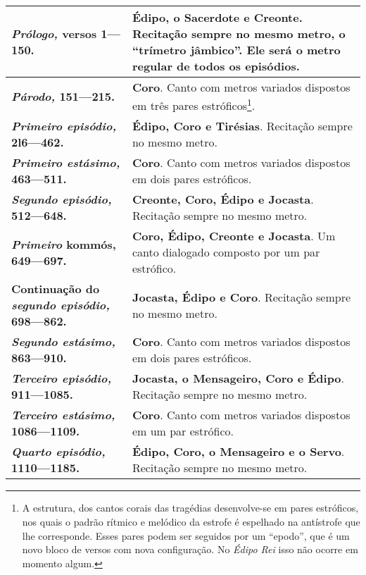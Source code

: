 \begin{tabular}[c]{|p{}|p{}|}
    \hline
    \textbf{\emph{Prólogo,} versos 1---150.}                    & \textbf{Édipo, o Sacerdote e Creonte}. Recitação sempre no mesmo metro, o ``trímetro jâmbico''. Ele será o metro regular de todos os episódios. \\ \hline
    \textbf{\emph{Párodo,} 151---215.}                          & \textbf{Coro}. Canto com metros variados dispostos em três pares estróficos\footnote{ A estrutura, dos cantos corais das tragédias desenvolve-se em pares estróficos, nos quais o padrão rítmico e melódico da estrofe é espelhado na antístrofe que lhe corresponde. Esses pares podem ser seguidos por um ``epodo'', que é um novo bloco de versos com nova configuração. No \emph{Édipo Rei} isso não ocorre em momento algum.}. \\ \hline
    \textbf{\emph{Primeiro episódio,} 2l6---462.}               & \textbf{Édipo, Coro e Tirésias}. Recitação sempre no mesmo metro. \\ \hline
    \textbf{\emph{Primeiro estásimo,} 463---511.}            & \textbf{Coro}. Canto com metros variados dispostos em dois pares estróficos. \\ \hline
    \textbf{\emph{Segundo episódio,} 512---648.}                & \textbf{Creonte, Coro, Édipo e Jocasta}. Recitação sempre no mesmo metro.  \\ \hline
    \textbf{\emph{Primeiro} kommós, 649---697.}       			& \textbf{Coro, Édipo, Creonte e Jocasta}. Um canto dialogado composto por um par estrófico. \\ \hline
    \textbf{Continuação do \emph{segundo episódio,} 698---862.} & \textbf{Jocasta, Édipo e Coro}. Recitação sempre no mesmo metro. \\ \hline
    \textbf{\emph{Segundo estásimo,} 863---910.}                & \textbf{Coro}. Canto com metros variados dispostos em dois pares estróficos. \\ \hline
    \textbf{\emph{Terceiro episódio,} 911---1085.}              & \textbf{Jocasta, o Mensageiro, Coro e Édipo}. Recitação sempre no mesmo metro. \\ \hline
    \textbf{\emph{Terceiro estásimo,} 1086---1109.}             & \textbf{Coro}. Canto com metros variados dispostos em um par estrófico. \\ \hline
    \textbf{\emph{Quarto episódio,} 1110---1185.}               & \textbf{Édipo, Coro, o Mensageiro e o Servo}. Recitação sempre no mesmo metro. \\ \hline

\end{tabular}
